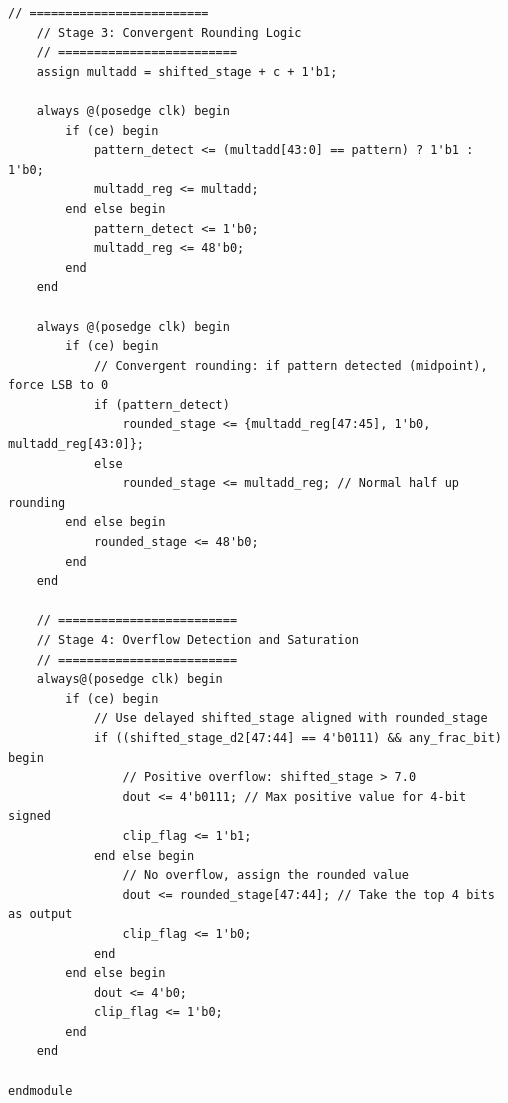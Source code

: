 \begin{lstlisting}[style={prettyverilog}, caption={Verilog code for the 4-bit convergent quantizer with gain and dynamic shift.}, label={lst:verilog_quantizer}]
    // =========================
    // Stage 3: Convergent Rounding Logic
    // =========================
    assign multadd = shifted_stage + c + 1'b1;
    
    always @(posedge clk) begin
        if (ce) begin
            pattern_detect <= (multadd[43:0] == pattern) ? 1'b1 : 1'b0;
            multadd_reg <= multadd;
        end else begin
            pattern_detect <= 1'b0;
            multadd_reg <= 48'b0;
        end
    end
    
    always @(posedge clk) begin
        if (ce) begin
            // Convergent rounding: if pattern detected (midpoint), force LSB to 0
            if (pattern_detect)
                rounded_stage <= {multadd_reg[47:45], 1'b0, multadd_reg[43:0]}; 
            else
                rounded_stage <= multadd_reg; // Normal half up rounding
        end else begin
            rounded_stage <= 48'b0;
        end
    end
    
    // =========================
    // Stage 4: Overflow Detection and Saturation
    // =========================
    always@(posedge clk) begin
        if (ce) begin
            // Use delayed shifted_stage aligned with rounded_stage
            if ((shifted_stage_d2[47:44] == 4'b0111) && any_frac_bit) begin
                // Positive overflow: shifted_stage > 7.0
                dout <= 4'b0111; // Max positive value for 4-bit signed
                clip_flag <= 1'b1;
            end else begin
                // No overflow, assign the rounded value
                dout <= rounded_stage[47:44]; // Take the top 4 bits as output
                clip_flag <= 1'b0;
            end
        end else begin
            dout <= 4'b0;
            clip_flag <= 1'b0;
        end
    end
    
endmodule
\end{lstlisting}

